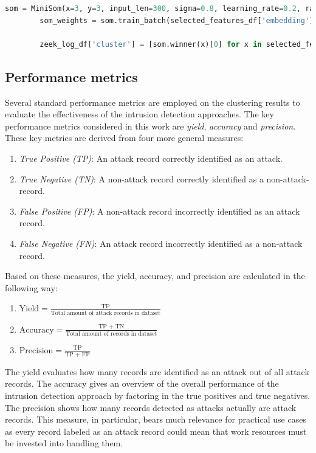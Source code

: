 \documentclass[
    fontsize=12pt,
    headings=small,
    parskip=half,           %
    bibliography=totoc,
    numbers=noenddot,       %
    open=any,               %
    ]{scrreprt}
\begin{document}
\begin{minipage}\linewidth
	\begin{lstlisting}[language={python}, caption={Application of the SOM clustering approach on the previously calculated embeddings}, label={lst:som}] 
		som = MiniSom(x=3, y=3, input_len=300, sigma=0.8, learning_rate=0.2, random_seed=10)
		som_weights = som.train_batch(selected_features_df['embedding'].tolist(), num_iteration=100)
		
		zeek_log_df['cluster'] = [som.winner(x)[0] for x in selected_features_df['embedding'].tolist()]
	\end{lstlisting}
\end{minipage}

\subsection{Performance metrics}
\label{subsec:performance_metrics}

Several standard performance metrics are employed on the clustering results to evaluate the effectiveness of the intrusion detection approaches. The key performance metrics considered in this work are \emph{yield}, \emph{accuracy} and \emph{precision}. These key metrics are derived from four more general measures:
\begin{enumerate}
	\item \emph{True Positive (TP)}: An attack record correctly identified as an attack.
	\item \emph{True Negative (TN)}: A non-attack record correctly identified as a non-attack-record.
	\item \emph{False Positive (FP)}: A non-attack record incorrectly identified as an attack record.
	\item \emph{False Negative (FN)}: An attack record incorrectly identified as a non-attack record.
\end{enumerate}

Based on these measures, the yield, accuracy, and precision are calculated in the following way:
\begin{enumerate}
    \item $\text{Yield} = \frac{\text{TP}}{\text{Total amount of attack records in dataset}}$
    \item $\text{Accuracy} = \frac{\text{TP + TN}}{\text{Total amount of records in dataset}}$
    \item $\text{Precision} = \frac{\text{TP}}{\text{TP + FP}}$
\end{enumerate}
The yield evaluates how many records are identified as an attack out of all attack records. The accuracy gives an overview of the overall performance of the intrusion detection approach by factoring in the true positives and true negatives. The precision shows how many records detected as attacks actually are attack records. This measure, in particular, bears much relevance for practical use cases as every record labeled as an attack record could mean that work resources must be invested into handling them.
\end{document}
